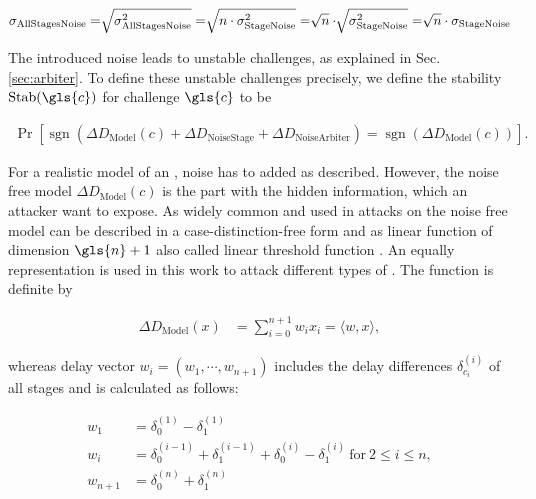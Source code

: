 \begin{align*}
\sigma_{\mathrm{All Stages Noise}} = \sqrt[]{\sigma_{\mathrm{All Stages Noise}}^2} = \sqrt[]{n \cdot \sigma_{\mathrm{Stage Noise}}^2} = \sqrt[]{n} \cdot \sqrt[]{\sigma_{\mathrm{Stage Noise}}^2} = \sqrt[]{n} \cdot \sigma_{\mathrm{Stage Noise}}
\end{align*}

The introduced noise leads to unstable challenges, as explained in Sec. \ref{sec:arbiter}.
To define these unstable challenges precisely, we define the stability $\Stab(\gls{c})$ for challenge $\gls{c}$ to be

\begin{align}
\Pr[\operatorname{sgn}(\Delta D_{\mathrm{Model}}(c) + \Delta D_{\mathrm{Noise Stage}} + \Delta D_{\mathrm{Noise Arbiter}}) = \operatorname{sgn}(\Delta D_{\mathrm{Model}}(c))]. \label{equ:stability}
\end{align}

For a realistic model of an \apuf, noise has to added as described. 
However, the noise free model $\Delta D_{\mathrm{Model}}(c)$ is the part with the hidden information, which an attacker want to expose. %
As widely common and used in attacks on \apuf the noise free model can be described in a case-distinction-free form and as linear function of dimension $\gls{n} + 1$ also called linear threshold function \cite{Majzoobi2008TestingSecurity, Majzoobi2008LightweightPUFs, Ruhrmair2010ModelingFunctions, Becker2015ThePUFs, Gassend2004IdentificationCircuits, Ganji2016PACPUFs}.
An equally representation is used in this work to attack different types of \apufs.
The function is definite by

\begin{align}
\Delta D_{\mathrm{Model}}(x) &= \sum_{i=0}^{n+1} w_i x_i = \langle w,x\rangle, \label{equ:pufmodelw}
\end{align}

whereas delay vector $w_i = (w_1, \cdots, w_{n+1})$ includes the delay differences $\delta_{c_i}^{(i)}$ of all stages and is calculated as follows:

\begin{align*}
w_1 &= \delta_{0}^{(1)} - \delta_{1}^{(1)}\\
w_i &= \delta_{0}^{(i-1)} + \delta_{1}^{(i-1)} + \delta_{0}^{(i)} - \delta_{1}^{(i)}\ \text{for}\ 2 \le i \le n,\\
w_{n+1} &= \delta_{0}^{(n)} + \delta_{1}^{(n)}
\end{align*}
 
